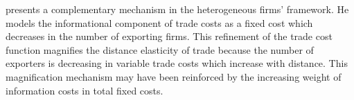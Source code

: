 \documentclass[12pt,twoside,a4paper,notitlepage]{article}
\begin{document}
\cite{Krautheim2012} presents a complementary mechanism in the heterogeneous firms' framework.
He models the informational component of trade costs as a fixed cost which decreases in the number of exporting firms.
This refinement of the trade cost function magnifies the distance elasticity of trade because the number of exporters is decreasing in variable trade costs which increase with distance.
This magnification mechanism may have been reinforced by the increasing weight of information costs in total fixed costs.
\end{document}
